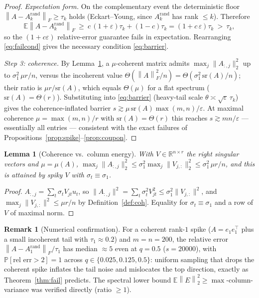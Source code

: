 \documentclass{amsart}
\newtheorem{lemma}{Lemma}
\theoremstyle{definition}
\newtheorem{remark}{Remark}
\newcommand{\R}{\mathbb{R}}
\newcommand{\Frob}[1]{\left\lVert #1\right\rVert_F}
\newcommand{\Op}[1]{\left\lVert #1\right\rVert_2}
\newcommand{\E}{\mathbb{E}}
\newcommand{\Prob}{\mathbb{P}}
\begin{document}
\begin{proof}
\emph{Expectation form.} On the complementary event the deterministic floor
$\Frob{A-A_k^{\mathrm{rand}}}\ge\tau_k$ holds (Eckart--Young, since
$A_k^{\mathrm{rand}}$ has rank $\le k$). Therefore
\[
\E\Frob{A-A_k^{\mathrm{rand}}}\ \ge\ c\,(1+\varepsilon)\tau_k+(1-c)\tau_k
=(1+c\,\varepsilon)\tau_k\ >\ \tau_k,
\]
so the $(1+c\varepsilon)$ relative-error guarantee fails in expectation.
Rearranging \eqref{eq:failcond} gives the necessary condition \eqref{eq:barrier}.

\emph{Step 3: coherence.} By Lemma~\ref{lem:colenergy}, a $\mu$-coherent matrix
admits $\max_j\|A_{:,j}\|_2^2$ up to $\sigma_1^2\,\mu r/n$, versus the incoherent
value $\Theta(\Frob A^2/n)=\Theta(\sigma_1^2\,\mathrm{sr}(A)/n)$; their ratio is
$\mu r/\mathrm{sr}(A)$, which equals $\Theta(\mu)$ for a flat spectrum
($\mathrm{sr}(A)=\Theta(r)$). Substituting into \eqref{eq:barrier} (heavy-tail
scale $\theta\asymp\sqrt\varepsilon\,\tau_k$) gives the coherence-inflated
barrier $s\gtrsim\mu\,\mathrm{sr}(A)\max(m,n)/\varepsilon$. At maximal coherence
$\mu=\max(m,n)/r$ with $\mathrm{sr}(A)=\Theta(r)$ this reaches
$s\gtrsim mn/\varepsilon$ --- essentially all entries --- consistent with the
exact failures of Propositions~\ref{prop:spike}--\ref{prop:coupon}.
\end{proof}

\begin{lemma}[Coherence vs.\ column energy]\label{lem:colenergy}
With $V\in\R^{n\times r}$ the right singular vectors and $\mu=\mu(A)$,
$\max_j\|A_{:,j}\|_2^2\le\sigma_1^2\max_j\|V_{j,:}\|_2^2\le\sigma_1^2\,\mu r/n$,
and this is attained by spiky $V$ with $\sigma_t\equiv\sigma_1$.
\end{lemma}

\begin{proof}
$A_{:,j}=\sum_t\sigma_t V_{jt}u_t$, so $\|A_{:,j}\|^2=\sum_t\sigma_t^2V_{jt}^2
\le\sigma_1^2\|V_{j,:}\|^2$, and $\max_j\|V_{j,:}\|^2\le\mu r/n$ by
Definition~\ref{def:coh}. Equality for $\sigma_t\equiv\sigma_1$ and a row of $V$
of maximal norm.
\end{proof}

\begin{remark}[Numerical confirmation]\label{rem:numfail}
For a coherent rank-$1$ spike ($A=e_1e_1^\top$ plus a small incoherent tail with
$\tau_1\approx0.2$) and $m=n=200$, the relative error
$\Frob{A-A_1^{\mathrm{rand}}}/\tau_1$ has median $\approx5$ even at $q=0.5$
($s=20000$), with $\Prob[\text{rel err}>2]=1$ across $q\in\{0.025,0.125,0.5\}$:
uniform sampling that drops the coherent spike inflates the tail noise and
mislocates the top direction, exactly as Theorem~\ref{thm:fail} predicts. The
spectral lower bound $\E\Op E^2\ge\max$-column-variance was verified directly
(ratio $\ge1$).
\end{remark}
\end{document}
